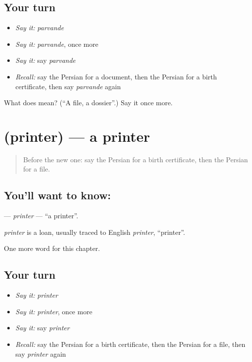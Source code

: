 \subsection*{Your turn}
\begin{itemize}
\raggedright
  \item \emph{Say it:} \emph{parvande}
  \item \emph{Say it:} \emph{parvande}, once more
  \item \emph{Say it:} say \emph{parvande}
  \item \emph{Recall:} say the Persian for a document, then the Persian for a birth certificate, then say \emph{parvande} again
\end{itemize}

\begin{tcolorbox}[breakable,colback=teal!4,colframe=teal!35!black,title={Before you move on}]
What does  mean? (\textquotedblleft{}A file, a dossier\textquotedblright{}.) Say it once more.
\end{tcolorbox}
\section[\texorpdfstring{\fa{پرینتر} (printer)}{پرینتر (printer)}]{ (printer) — a printer}

\label{lesson:FA-C206-printer}



\begin{quote}
Before the new one: say the Persian for a birth certificate, then the Persian for a file.
\end{quote}

\subsection*{You'll want to know: }
\textbf{} — \emph{printer} — \textquotedblleft{}a printer\textquotedblright{}.

\begin{cousinweb}
\emph{printer} is a loan, usually traced to English \emph{printer}, \textquotedblleft{}printer\textquotedblright{}.
\end{cousinweb}

\begin{grammarlens}[title={What you've built}]
One more word for this chapter.
\end{grammarlens}

\subsection*{Your turn}
\begin{itemize}
\raggedright
  \item \emph{Say it:} \emph{printer}
  \item \emph{Say it:} \emph{printer}, once more
  \item \emph{Say it:} say \emph{printer}
  \item \emph{Recall:} say the Persian for a birth certificate, then the Persian for a file, then say \emph{printer} again
\end{itemize}

